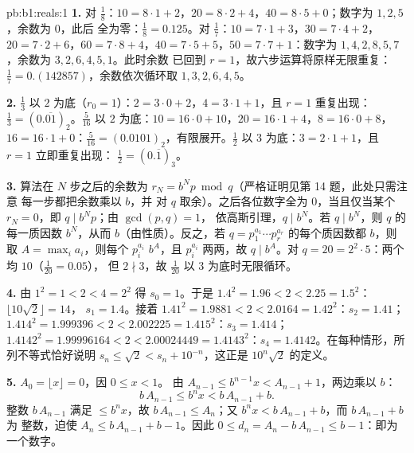 \begin{solution}{pb:b1:reals:1}
\textbf{1.} 对 $\frac 18$：$10 = 8 \cdot 1 + 2$，$20 = 8 \cdot 2
+ 4$，$40 = 8 \cdot 5 + 0$；数字为 $1, 2, 5$，余数为 $0$，此后
全为零：$\frac 18 = 0.125$。对 $\frac 17$：$10 = 7 \cdot 1 +
3$，$30 = 7 \cdot 4 + 2$，$20 = 7 \cdot 2 + 6$，$60 = 7 \cdot 8 +
4$，$40 = 7 \cdot 5 + 5$，$50 = 7 \cdot 7 + 1$：数字为 $1, 4, 2,
8, 5, 7$，余数为 $3, 2, 6, 4, 5, 1$。此时余数
已回到 $r = 1$，故六步运算将原样无限重复：
$\frac 17 = 0.(142857)$，余数依次循环取 $1, 3, 2, 6,
4, 5$。

\textbf{2.} $\frac 13$ 以 $2$ 为底（$r_0 = 1$）：$2 = 3 \cdot 0 +
2$，$4 = 3 \cdot 1 + 1$，且 $r = 1$ 重复出现：$\frac 13 =
(0.\overline{01})_2$。$\frac{5}{16}$ 以 $2$ 为底：$10 = 16 \cdot
0 + 10$，$20 = 16 \cdot 1 + 4$，$8 = 16 \cdot 0 + 8$，$16 = 16
\cdot 1 + 0$：$\frac{5}{16} = (0.0101)_2$，有限展开。$\frac 12$
以 $3$ 为底：$3 = 2 \cdot 1 + 1$，且 $r = 1$ 立即重复出现：
$\frac 12 = (0.\overline{1})_3$。

\textbf{3.} 算法在 $N$ 步之后的余数为 $r_N =
b^N p \bmod q$（严格证明见第 14 题，此处只需注意
每一步都把余数乘以 $b$，并
对 $q$ 取余）。之后各位数字全为 $0$，当且仅当某个
$r_N = 0$，即 $q \mid b^N p$；由 $\gcd(p, q) = 1$，
依高斯引理，$q \mid b^N$。若 $q \mid b^N$，则
$q$ 的每一质因数 $b^N$，从而 $b$（由性质）。反之，若
$q = p_1^{a_1} \cdots p_r^{a_r}$ 的每个质因数都 $b$，则
取 $A = \max_i a_i$，则每个 $p_i^{a_i}$  $b^A$，且
$p_i^{a_i}$ 两两，故 $q \mid b^A$。对 $q = 20 =
2^2 \cdot 5$：两个均 $10$（$\frac{1}{20} = 0.05$），
但 $2 \nmid 3$，故 $\frac{1}{20}$ 以 $3$ 为底时无限循环。

\textbf{4.} 由 $1^2 = 1 < 2 < 4 = 2^2$ 得 $s_0 = 1$。于是 $1.4^2
= 1.96 < 2 < 2.25 = 1.5^2$：$\lfloor 10\sqrt 2 \rfloor = 14$，
$s_1 = 1.4$。接着 $1.41^2 = 1.9881 < 2 < 2.0164 = 1.42^2$：$s_2 =
1.41$；$1.414^2 = 1.999396 < 2 < 2.002225 = 1.415^2$：$s_3 =
1.414$；$1.4142^2 = 1.99996164 < 2 < 2.00024449 = 1.4143^2$：$s_4
= 1.4142$。在每种情形，所列不等式恰好说明
$s_n \leq \sqrt 2 < s_n + 10^{-n}$，这正是
$10^n \sqrt 2$ 的定义。

\textbf{5.} $A_0 = \lfloor x \rfloor = 0$，因 $0 \leq x < 1$。
由 $A_{n-1} \leq b^{n-1} x < A_{n-1} + 1$，两边乘以 $b$：
\[
b\,A_{n-1} \leq b^n x < b\,A_{n-1} + b .
\]
整数 $b\,A_{n-1}$ 满足 $\leq b^n x$，故 $b\,A_{n-1} \leq
A_n$；又 $b^n x < b\,A_{n-1} + b$，而 $b\,A_{n-1} + b$ 为
整数，迫使 $A_n \leq b\,A_{n-1} + b - 1$。因此 $0 \leq d_n =
A_n - b\,A_{n-1} \leq b - 1$：即为一个数字。


\end{solution}
